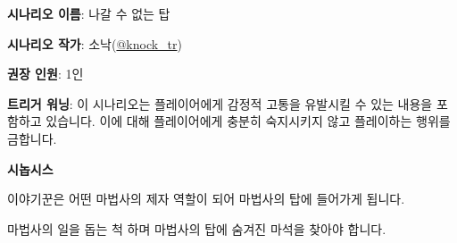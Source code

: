 \documentclass{report}
\begin{document}
	\textbf{시나리오 이름}: 나갈 수 없는 탑
	
	\textbf{시나리오 작가}: 소낙(\href{https://twitter.com/knock_tr}{@knock\_tr})
	
	\textbf{권장 인원}: 1인
	
	\textbf{트리거 워닝}: 이 시나리오는 플레이어에게 감정적 고통을 유발시킬 수 있는 내용을 포함하고 있습니다. 이에 대해 플레이어에게 충분히 숙지시키지 않고 플레이하는 행위를 금합니다.
	
	\textbf{시놉시스}
	
	이야기꾼은 어떤 마법사의 제자 역할이 되어 마법사의 탑에 들어가게 됩니다.
  
  마법사의 일을 돕는 척 하며 마법사의 탑에 숨겨진 마석을 찾아야 합니다.
\end{document}
